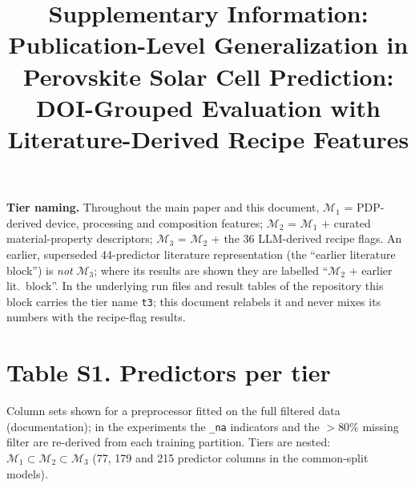 \documentclass[10pt]{article}
\title{Supplementary Information: Publication-Level Generalization in Perovskite Solar Cell Prediction: DOI-Grouped Evaluation with Literature-Derived Recipe Features}
\date{}
\begin{document}
\maketitle\small
\noindent\textbf{Tier naming.} Throughout the main paper and this document, $\mathcal{M}_1$ = PDP-derived device, processing and composition features; $\mathcal{M}_2$ = $\mathcal{M}_1$ + curated material-property descriptors; $\mathcal{M}_3$ = $\mathcal{M}_2$ + the 36 LLM-derived recipe flags. An earlier, superseded 44-predictor literature representation (the ``earlier literature block'') is \emph{not} $\mathcal{M}_3$; where its results are shown they are labelled ``$\mathcal{M}_2$ + earlier lit.\ block''. In the underlying run files and result tables of the repository this block carries the tier name \texttt{t3}; this document relabels it and never mixes its numbers with the recipe-flag results.\par
\section*{Table S1. Predictors per tier}
Column sets shown for a preprocessor fitted on the full filtered data (documentation); in the experiments the \texttt{\_na} indicators and the $>$80\% missing filter are re-derived from each training partition. Tiers are nested: $\mathcal{M}_1\subset \mathcal{M}_2\subset \mathcal{M}_3$ (77, 179 and 215 predictor columns in the common-split models).\par
\end{document}
